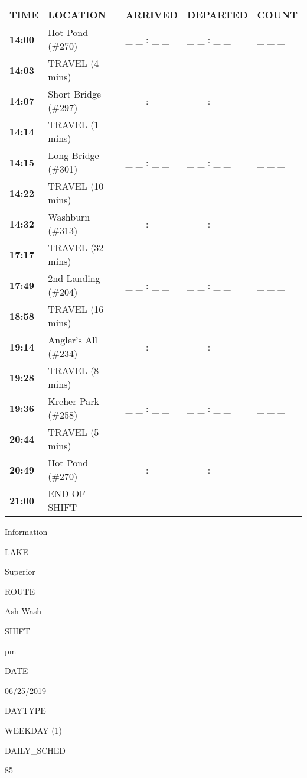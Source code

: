 \documentclass[]{article}
\begin{document}
\begin{tabular}{>{\bfseries}lllll}
\toprule
\textbf{TIME} & \textbf{LOCATION} & \textbf{ARRIVED} & \textbf{DEPARTED} & \textbf{COUNT}\\
\midrule
14:00 & Hot Pond (\#270) & \_ \_ : \_ \_ & \_ \_ : \_ \_ & \_ \_ \_\\
14:03 & TRAVEL (4 mins) &  &  & \\
14:07 & Short Bridge (\#297) & \_ \_ : \_ \_ & \_ \_ : \_ \_ & \_ \_ \_\\
14:14 & TRAVEL (1 mins) &  &  & \\
14:15 & Long Bridge (\#301) & \_ \_ : \_ \_ & \_ \_ : \_ \_ & \_ \_ \_\\
14:22 & TRAVEL (10 mins) &  &  & \\
14:32 & Washburn (\#313) & \_ \_ : \_ \_ & \_ \_ : \_ \_ & \_ \_ \_\\
17:17 & TRAVEL (32 mins) &  &  & \\
17:49 & 2nd Landing (\#204) & \_ \_ : \_ \_ & \_ \_ : \_ \_ & \_ \_ \_\\
18:58 & TRAVEL (16 mins) &  &  & \\
19:14 & Angler's All (\#234) & \_ \_ : \_ \_ & \_ \_ : \_ \_ & \_ \_ \_\\
19:28 & TRAVEL (8 mins) &  &  & \\
19:36 & Kreher Park (\#258) & \_ \_ : \_ \_ & \_ \_ : \_ \_ & \_ \_ \_\\
20:44 & TRAVEL (5 mins) &  &  & \\
20:49 & Hot Pond (\#270) & \_ \_ : \_ \_ & \_ \_ : \_ \_ & \_ \_ \_\\
21:00 & END OF SHIFT &  &  & \\
\bottomrule
\end{tabular}\newpage

Information

LAKE

Superior

ROUTE

Ash-Wash

SHIFT

pm

DATE

06/25/2019

DAYTYPE

WEEKDAY (1)

DAILY\_SCHED

85

\vspace{24pt}
\end{document}
